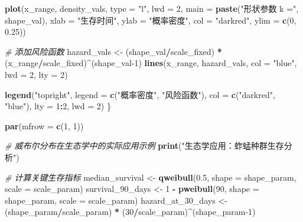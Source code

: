\documentclass[
]{book}
\newenvironment{Shaded}{\begin{snugshade}}{\end{snugshade}}
\newcommand{\AttributeTok}[1]{\textcolor[rgb]{0.13,0.29,0.53}{#1}}
\newcommand{\CommentTok}[1]{\textcolor[rgb]{0.56,0.35,0.01}{\textit{#1}}}
\newcommand{\DecValTok}[1]{\textcolor[rgb]{0.00,0.00,0.81}{#1}}
\newcommand{\FloatTok}[1]{\textcolor[rgb]{0.00,0.00,0.81}{#1}}
\newcommand{\FunctionTok}[1]{\textcolor[rgb]{0.13,0.29,0.53}{\textbf{#1}}}
\newcommand{\NormalTok}[1]{#1}
\newcommand{\OtherTok}[1]{\textcolor[rgb]{0.56,0.35,0.01}{#1}}
\newcommand{\SpecialCharTok}[1]{\textcolor[rgb]{0.81,0.36,0.00}{\textbf{#1}}}
\newcommand{\StringTok}[1]{\textcolor[rgb]{0.31,0.60,0.02}{#1}}
\begin{document}
\begin{Shaded}
\begin{Highlighting}[]
  \FunctionTok{plot}\NormalTok{(x\_range, density\_vals, }\AttributeTok{type =} \StringTok{"l"}\NormalTok{, }\AttributeTok{lwd =} \DecValTok{2}\NormalTok{,}
       \AttributeTok{main =} \FunctionTok{paste}\NormalTok{(}\StringTok{"形状参数 k ="}\NormalTok{, shape\_val),}
       \AttributeTok{xlab =} \StringTok{"生存时间"}\NormalTok{, }\AttributeTok{ylab =} \StringTok{"概率密度"}\NormalTok{,}
       \AttributeTok{col =} \StringTok{"darkred"}\NormalTok{, }\AttributeTok{ylim =} \FunctionTok{c}\NormalTok{(}\DecValTok{0}\NormalTok{, }\FloatTok{0.25}\NormalTok{))}

  \CommentTok{\# 添加风险函数}
\NormalTok{  hazard\_vals }\OtherTok{\textless{}{-}}\NormalTok{ (shape\_val}\SpecialCharTok{/}\NormalTok{scale\_fixed) }\SpecialCharTok{*}\NormalTok{ (x\_range}\SpecialCharTok{/}\NormalTok{scale\_fixed)}\SpecialCharTok{\^{}}\NormalTok{(shape\_val}\DecValTok{{-}1}\NormalTok{)}
  \FunctionTok{lines}\NormalTok{(x\_range, hazard\_vals, }\AttributeTok{col =} \StringTok{"blue"}\NormalTok{, }\AttributeTok{lwd =} \DecValTok{2}\NormalTok{, }\AttributeTok{lty =} \DecValTok{2}\NormalTok{)}

  \FunctionTok{legend}\NormalTok{(}\StringTok{"topright"}\NormalTok{, }\AttributeTok{legend =} \FunctionTok{c}\NormalTok{(}\StringTok{"概率密度"}\NormalTok{, }\StringTok{"风险函数"}\NormalTok{),}
         \AttributeTok{col =} \FunctionTok{c}\NormalTok{(}\StringTok{"darkred"}\NormalTok{, }\StringTok{"blue"}\NormalTok{), }\AttributeTok{lty =} \DecValTok{1}\SpecialCharTok{:}\DecValTok{2}\NormalTok{, }\AttributeTok{lwd =} \DecValTok{2}\NormalTok{)}
\NormalTok{\}}

\FunctionTok{par}\NormalTok{(}\AttributeTok{mfrow =} \FunctionTok{c}\NormalTok{(}\DecValTok{1}\NormalTok{, }\DecValTok{1}\NormalTok{))}

\CommentTok{\# 威布尔分布在生态学中的实际应用示例}
\FunctionTok{print}\NormalTok{(}\StringTok{"生态学应用：蚱蜢种群生存分析"}\NormalTok{)}

\CommentTok{\# 计算关键生存指标}
\NormalTok{median\_survival }\OtherTok{\textless{}{-}} \FunctionTok{qweibull}\NormalTok{(}\FloatTok{0.5}\NormalTok{, }\AttributeTok{shape =}\NormalTok{ shape\_param, }\AttributeTok{scale =}\NormalTok{ scale\_param)}
\NormalTok{survival\_90\_days }\OtherTok{\textless{}{-}} \DecValTok{1} \SpecialCharTok{{-}} \FunctionTok{pweibull}\NormalTok{(}\DecValTok{90}\NormalTok{, }\AttributeTok{shape =}\NormalTok{ shape\_param, }\AttributeTok{scale =}\NormalTok{ scale\_param)}
\NormalTok{hazard\_at\_30\_days }\OtherTok{\textless{}{-}}\NormalTok{ (shape\_param}\SpecialCharTok{/}\NormalTok{scale\_param) }\SpecialCharTok{*}\NormalTok{ (}\DecValTok{30}\SpecialCharTok{/}\NormalTok{scale\_param)}\SpecialCharTok{\^{}}\NormalTok{(shape\_param}\DecValTok{{-}1}\NormalTok{)}


\end{Highlighting}
\end{Shaded}
\end{document}
